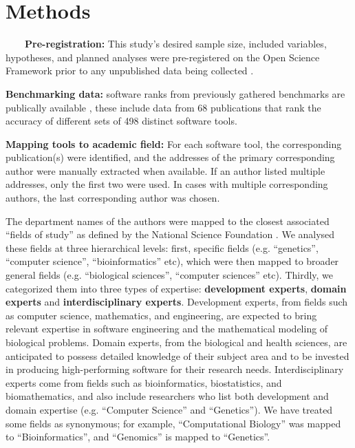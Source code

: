 \documentclass[fleqn,10pt,doc,onecolumn]{SelfArx}%
\begin{document}
\section*{Methods}

~~~~\textbf{Pre-registration:} This study's desired sample size, included variables, hypotheses, and
planned analyses were pre-registered on the Open Science Framework
prior to any unpublished data being collected \cite{gardner2024}.

\textbf{Benchmarking data:} software ranks from previously gathered
benchmarks are publically available \cite{Gardner:2022}, these include data from
68 publications that rank the accuracy of different sets of 498
distinct software tools.

\textbf{Mapping tools to academic field:} For each software tool, the
corresponding publication(s) were identified, and the addresses of the
primary corresponding author were manually extracted when
available. If an author listed multiple addresses, only the first two
were used. In cases with multiple corresponding authors, the last
corresponding author was chosen.

The department names of the authors were mapped to the closest
associated ``fields of study'' as defined by the National Science
Foundation \cite{fields2014}. We analysed these fields at three
hierarchical levels: first, specific fields (e.g. ``genetics'',
``computer science'', ``bioinformatics'' etc), which were then mapped
to broader general fields (e.g. ``biological sciences'', ``computer
sciences'' etc). Thirdly, we categorized them into three types of
expertise: \textbf{development experts}, \textbf{domain experts} and
\textbf{interdisciplinary experts}.  Development experts, from fields
such as computer science, mathematics, and engineering, are expected
to bring relevant expertise in software engineering and the
mathematical modeling of biological problems. Domain experts, from the
biological and health sciences, are anticipated to possess detailed
knowledge of their subject area and to be invested in producing
high-performing software for their research needs. Interdisciplinary
experts come from fields such as bioinformatics, biostatistics, and
biomathematics, and also include researchers who list both development
and domain expertise (e.g. ``Computer Science'' and ``Genetics''). We
have treated some fields as synonymous; for example, ``Computational
Biology'' was mapped to ``Bioinformatics'', and ``Genomics'' is mapped
to ``Genetics''.
\end{document}
